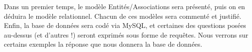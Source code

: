 \bigskip
Dans un premier temps, le modèle Entités/Associations sera présenté, puis on en déduira le modèle relationnel. Chacun de ces modèles sera commenté et justifié.\\
Enfin, la base de données sera codé via MySQL, et certaines des questions posées au-dessus (et d'autres !) seront exprimés sous forme de requêtes. Nous verrons sur certains exemples la réponse que nous donnera la base de données.
